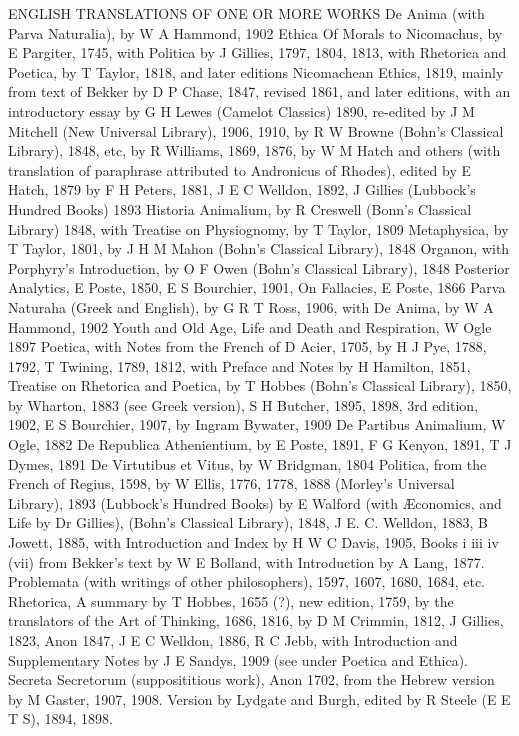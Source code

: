 ENGLISH TRANSLATIONS OF ONE OR MORE WORKS De Anima (with Parva Naturalia), by W
A Hammond, 1902 Ethica Of Morals to Nicomachus, by E Pargiter, 1745, with
Politica by J Gillies, 1797, 1804, 1813, with Rhetorica and Poetica, by T
Taylor, 1818, and later editions Nicomachean Ethics, 1819, mainly from text of
Bekker by D P Chase, 1847, revised 1861, and later editions, with an
introductory essay by G H Lewes (Camelot Classics) 1890, re-edited by J M
Mitchell (New Universal Library), 1906, 1910, by R W Browne (Bohn’s
Classical Library), 1848, etc, by R Williams, 1869, 1876, by W M Hatch and
others (with translation of paraphrase attributed to Andronicus of Rhodes),
edited by E Hatch, 1879 by F H Peters, 1881, J E C Welldon, 1892, J Gillies
(Lubbock’s Hundred Books) 1893 Historia Animalium, by R Creswell
(Bonn’s Classical Library) 1848, with Treatise on Physiognomy, by T
Taylor, 1809 Metaphysica, by T Taylor, 1801, by J H M Mahon (Bohn’s
Classical Library), 1848 Organon, with Porphyry’s Introduction, by O F
Owen (Bohn’s Classical Library), 1848 Posterior Analytics, E Poste, 1850,
E S Bourchier, 1901, On Fallacies, E Poste, 1866 Parva Naturaha (Greek and
English), by G R T Ross, 1906, with De Anima, by W A Hammond, 1902 Youth and
Old Age, Life and Death and Respiration, W Ogle 1897 Poetica, with Notes from
the French of D Acier, 1705, by H J Pye, 1788, 1792, T Twining, 1789, 1812,
with Preface and Notes by H Hamilton, 1851, Treatise on Rhetorica and Poetica,
by T Hobbes (Bohn’s Classical Library), 1850, by Wharton, 1883 (see Greek
version), S H Butcher, 1895, 1898, 3rd edition, 1902, E S Bourchier, 1907, by
Ingram Bywater, 1909 De Partibus Animalium, W Ogle, 1882 De Republica
Athenientium, by E Poste, 1891, F G Kenyon, 1891, T J Dymes, 1891 De Virtutibus
et Vitus, by W Bridgman, 1804 Politica, from the French of Regius, 1598, by W
Ellis, 1776, 1778, 1888 (Morley’s Universal Library), 1893
(Lubbock’s Hundred Books) by E Walford (with Æconomics, and Life by Dr
Gillies), (Bohn’s Classical Library), 1848, J E. C. Welldon, 1883, B
Jowett, 1885, with Introduction and Index by H W C Davis, 1905, Books i iii iv
(vii) from Bekker’s text by W E Bolland, with Introduction by A Lang,
1877. Problemata (with writings of other philosophers), 1597, 1607, 1680, 1684,
etc. Rhetorica, A summary by T Hobbes, 1655 (?), new edition, 1759, by the
translators of the Art of Thinking, 1686, 1816, by D M Crimmin, 1812, J
Gillies, 1823, Anon 1847, J E C Welldon, 1886, R C Jebb, with Introduction and
Supplementary Notes by J E Sandys, 1909 (see under Poetica and Ethica). Secreta
Secretorum (supposititious work), Anon 1702, from the Hebrew version by M
Gaster, 1907, 1908. Version by Lydgate and Burgh, edited by R Steele (E E T S),
1894, 1898.

